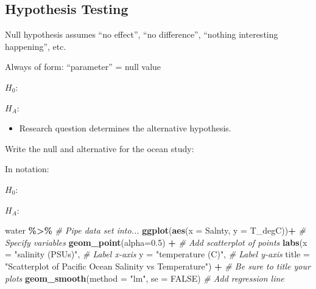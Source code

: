 \documentclass[
]{report}
\newenvironment{Shaded}{\begin{snugshade}}{\end{snugshade}}
\newcommand{\AttributeTok}[1]{\textcolor[rgb]{0.13,0.29,0.53}{#1}}
\newcommand{\CommentTok}[1]{\textcolor[rgb]{0.56,0.35,0.01}{\textit{#1}}}
\newcommand{\ConstantTok}[1]{\textcolor[rgb]{0.56,0.35,0.01}{#1}}
\newcommand{\FloatTok}[1]{\textcolor[rgb]{0.00,0.00,0.81}{#1}}
\newcommand{\FunctionTok}[1]{\textcolor[rgb]{0.13,0.29,0.53}{\textbf{#1}}}
\newcommand{\NormalTok}[1]{#1}
\newcommand{\SpecialCharTok}[1]{\textcolor[rgb]{0.81,0.36,0.00}{\textbf{#1}}}
\newcommand{\StringTok}[1]{\textcolor[rgb]{0.31,0.60,0.02}{#1}}
\providecommand{\tightlist}{%
  \setlength{\itemsep}{0pt}\setlength{\parskip}{0pt}}
\newcommand{\rgi}{\hspace{24pt}}  %
\begin{document}
\subsection*{Hypothesis Testing}\label{hypothesis-testing-2}

Null hypothesis assumes ``no effect'', ``no difference'', ``nothing interesting happening'', etc.

\rgi Always of form: ``parameter'' = null value

\(H_0:\)

\vspace{0.5in}

\(H_A:\)

\vspace{0.5in}

\begin{itemize}
\tightlist
\item
  Research question determines the alternative hypothesis.
\end{itemize}

Write the null and alternative for the ocean study:

In notation:

\(H_0:\)

\vspace{0.2in}

\(H_A:\)

\vspace{0.2in}

\begin{Shaded}
\begin{Highlighting}[]
\NormalTok{water }\SpecialCharTok{\%\textgreater{}\%} \CommentTok{\# Pipe data set into...}
\FunctionTok{ggplot}\NormalTok{(}\FunctionTok{aes}\NormalTok{(}\AttributeTok{x =}\NormalTok{ Salnty, }\AttributeTok{y =}\NormalTok{ T\_degC))}\SpecialCharTok{+}  \CommentTok{\# Specify variables}
  \FunctionTok{geom\_point}\NormalTok{(}\AttributeTok{alpha=}\FloatTok{0.5}\NormalTok{) }\SpecialCharTok{+}  \CommentTok{\# Add scatterplot of points}
  \FunctionTok{labs}\NormalTok{(}\AttributeTok{x =} \StringTok{"salinity (PSUs)"}\NormalTok{,  }\CommentTok{\# Label x{-}axis}
       \AttributeTok{y =} \StringTok{"temperature (C)"}\NormalTok{,  }\CommentTok{\# Label y{-}axis}
       \AttributeTok{title =} \StringTok{"Scatterplot of Pacific Ocean Salinity vs Temperature"}\NormalTok{) }\SpecialCharTok{+}
               \CommentTok{\# Be sure to title your plots}
  \FunctionTok{geom\_smooth}\NormalTok{(}\AttributeTok{method =} \StringTok{"lm"}\NormalTok{, }\AttributeTok{se =} \ConstantTok{FALSE}\NormalTok{)  }\CommentTok{\# Add regression line}
\end{Highlighting}
\end{Shaded}
\end{document}
